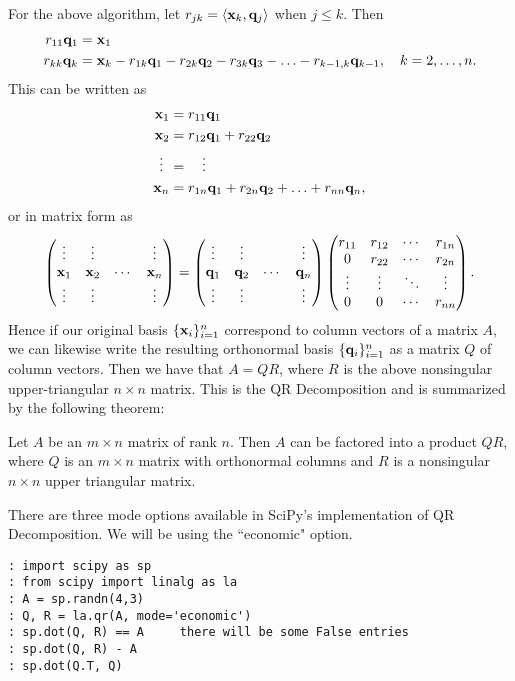 For the above algorithm, let $r_{j k} = \langle {\bf x}_k, {\bf q}_j\rangle$ when $j \leq k$.  Then
\begin{align*}
r_{1 1} {\bf q}_1 &= {\bf x}_1\\
r_{k k} {\bf q}_k &= {\bf x}_k - r_{1 k} {\bf q}_1 - r_{2 k} {\bf q}_2 - r_{3 k} {\bf q}_3 -
\ldots - r_{k-1, k} {\bf q}_{k-1},\quad k=2,\ldots,n.
\end{align*}
This can be written as
\begin{align*}
{\bf x}_1 &= r_{1 1} {\bf q}_1\\
{\bf x}_2 &= r_{1 2} {\bf q}_1 + r_{2 2} {\bf q}_2\\
\vdots \:\: &= \quad \vdots\\
{\bf x}_n &= r_{1 n} {\bf q}_1 + r_{2 n} {\bf q}_2 + \ldots + r_{n n} {\bf q}_{n},
\end{align*}
or in matrix form as
\[
\begin{pmatrix}
\vdots & \vdots & & \vdots\\
{\bf x}_1 & {\bf x}_2 & \cdots & {\bf x}_n\\
\vdots & \vdots & & \vdots
\end{pmatrix}
=
\begin{pmatrix}
\vdots & \vdots & & \vdots\\
{\bf q}_1 & {\bf q}_2 & \cdots & {\bf q}_n\\
\vdots & \vdots & & \vdots
\end{pmatrix}
\begin{pmatrix}
r_{1 1} & r_{1 2} & \cdots & r_{1 n}\\
0 & r_{2 2} & \cdots & r_{2 n}\\
\vdots & \vdots & \ddots & \vdots\\
0 & 0 & \cdots & r_{n n}
\end{pmatrix}.
\]
Hence if our original basis $\{{\bf x}_i\}_{i=1}^n$ correspond to column
vectors of a matrix $A$, we can likewise write the resulting
orthonormal basis $\{{\bf q}_i\}_{i=1}^n$ as a matrix $Q$ of column
vectors.  Then we have that $A = Q R$, where $R$ is the above
nonsingular upper-triangular $n\times n$ matrix.  This is the QR
Decomposition and is summarized by the following theorem:
\vspace{5mm}
\begin{theorem}
Let $A$ be an $m\times n$ matrix of rank $n$.  Then $A$ can be
factored into a product $Q R$, where $Q$ is an $m\times n$ matrix
with orthonormal columns and $R$ is a nonsingular $n \times n$ upper
triangular matrix.
\end{theorem}


There are three mode options available in SciPy's implementation of QR Decomposition.  We will be using the ``economic" option.
\begin{lstlisting}
: import scipy as sp
: from scipy import linalg as la
: A = sp.randn(4,3)
: Q, R = la.qr(A, mode='economic')
: sp.dot(Q, R) == A     there will be some False entries
: sp.dot(Q, R) - A
: sp.dot(Q.T, Q)
\end{lstlisting}

